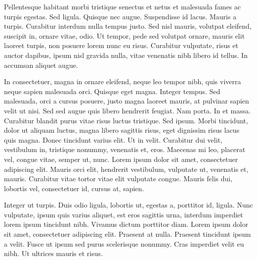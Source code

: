 Pellentesque habitant morbi tristique senectus et netus et malesuada fames ac turpis egestas. Sed
ligula. Quisque nec augue. Suspendisse id lacus. Mauris a turpis. Curabitur interdum nulla tempus
justo. Sed nisl mauris, volutpat eleifend, suscipit in, ornare vitae, odio. Ut tempor, pede sed
volutpat ornare, mauris elit laoreet turpis, non posuere lorem nunc eu risus. Curabitur vulputate,
risus et auctor dapibus, ipsum nisl gravida nulla, vitae venenatis nibh libero id tellus. In
accumsan aliquet augue.

In consectetuer, magna in ornare eleifend, neque leo tempor nibh, quis viverra neque sapien
malesuada orci. Quisque eget magna. Integer tempus. Sed malesuada, orci a cursus posuere, justo
magna laoreet mauris, at pulvinar sapien velit ut nisi. Sed sed augue quis libero hendrerit feugiat.
Nam porta. In et massa. Curabitur blandit purus vitae risus luctus tristique. Sed ipsum. Morbi
tincidunt, dolor ut aliquam luctus, magna libero sagittis risus, eget dignissim risus lacus quis
magna. Donec tincidunt varius elit. Ut in velit. Curabitur dui velit, vestibulum in, tristique
nonummy, venenatis et, eros. Maecenas mi leo, placerat vel, congue vitae, semper ut, nunc. Lorem
ipsum dolor sit amet, consectetuer adipiscing elit. Mauris orci elit, hendrerit vestibulum,
vulputate ut, venenatis et, mauris. Curabitur vitae tortor vitae elit vulputate congue. Mauris felis
dui, lobortis vel, consectetuer id, cursus at, sapien.

Integer ut turpis. Duis odio ligula, lobortis ut, egestas a, porttitor id, ligula. Nunc vulputate,
ipsum quis varius aliquet, est eros sagittis urna, interdum imperdiet lorem ipsum tincidunt nibh.
Vivamus dictum porttitor diam. Lorem ipsum dolor sit amet, consectetuer adipiscing elit. Praesent at
nulla. Praesent tincidunt ipsum a velit. Fusce ut ipsum sed purus scelerisque nonummy. Cras
imperdiet velit eu nibh. Ut ultrices mauris et risus.


